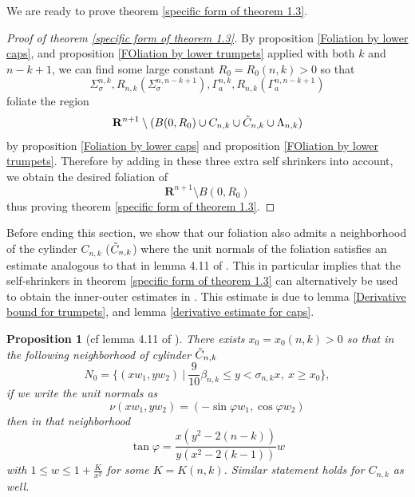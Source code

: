 \documentclass[pdflatex,sn-mathphys-num]{sn-jnl}
\newtheorem{proposition}[theorem]{Proposition}
\begin{document}
We are ready to prove theorem \ref{specific form of theorem 1.3}.
\begin{proof}[Proof of theorem \ref{specific form of theorem 1.3}]
    By proposition \ref{Foliation by lower caps}, and proposition \ref{FOliation by lower trumpets} applied with both $k$ and $n -k + 1$, we can find some large constant $R_0 = R_0(n,k) > 0$ so that
    \begin{equation}
        \Sigma^{n,k}_{\sigma}, R_{n,k}(\Sigma^{n,n-k+1}_{\sigma}), \Gamma^{n,k}_{a}, R_{n,k}(\Gamma^{n,n-k+1}_a)
    \end{equation}
  foliate the region
    $$\mathbf{R}^{n+1} \setminus (B(0, R_0)\cup C_{n,k}\cup \Tilde{C}_{n,k}\cup \Lambda_{n,k})$$
    by proposition \ref{Foliation by lower caps} and proposition \ref{FOliation by lower trumpets}.
    Therefore by adding in these three extra self shrinkers into account, we obtain the desired foliation of
    $$\mathbf{R}^{n+1} \setminus B(0, R_0)$$
    thus proving theorem \ref{specific form of theorem 1.3}.
    
\end{proof}
Before ending this section, we show that our foliation also admits a neighborhood of the cylinder $C_{n,k}$ ($\Tilde{C}_{n,k}$) where the unit normals of the foliation satisfies an estimate analogous to that in lemma 4.11 of \cite{ADS}. This in particular implies that the self-shrinkers in theorem \ref{specific form of theorem 1.3} can alternatively be used to obtain the inner-outer estimates in \cite{Du}. This estimate is due to lemma \ref{Derivative bound for trumpets}, and lemma \ref{derivative estimate for caps}.
\begin{proposition}[cf lemma 4.11 of \cite{ADS}]\label{good neighborhood with good normals}
    There exists $x_0 = x_0(n,k) > 0$ so that in the following neighborhood of cylinder $\Tilde{C}_{n,k}$
    $$N_0 = \{(xw_1, yw_2)\ | \ \frac{9}{10}\beta_{n,k} \leq y < \sigma_{n,k}x, \ x \geq x_0\},$$
    if we write the unit normals as
    $$\nu(xw_1, yw_2) = (-\sin \varphi w_1, \cos \varphi w_2)$$
    then in that neighborhood
    $$\tan \varphi = \frac{x(y^2 - 2(n-k))}{y(x^2 - 2(k-1))}w$$
    with $1 \leq w \leq 1 + \frac{K}{x^2}$
    for some $K = K(n,k)$. Similar statement holds for $C_{n,k}$ as well.
\end{proposition}
\end{document}
